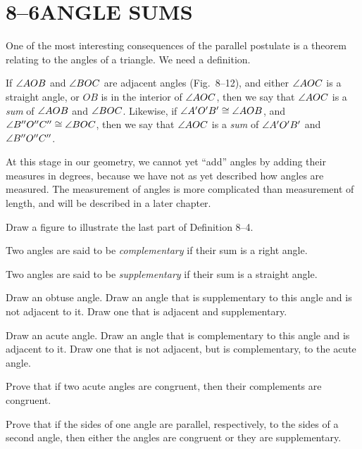 \documentclass[11pt]{book}
\begin{document}
\section*{8--6\quad ANGLE SUMS}

One of the most interesting consequences of the parallel postulate is a
theorem relating to the angles of a triangle. We need a definition.

\begin{definition}
If $\angle AOB$ and $\angle BOC$ are adjacent angles (Fig.~8--12), and either
$\angle AOC$ is a straight angle, or $OB$ is in the interior of $\angle AOC$,
then we say that $\angle AOC$ is a \emph{sum} of $\angle AOB$ and $\angle BOC$.
Likewise, if $\angle A'O'B' \cong \angle AOB$, and
$\angle B''O''C'' \cong \angle BOC$, then we say that $\angle AOC$ is a
\emph{sum} of $\angle A'O'B'$ and $\angle B''O''C''$.
\end{definition}

\FIGVIIITWELVE

\begin{remark}
At this stage in our geometry, we cannot yet ``add'' angles by adding their
measures in degrees, because we have not as yet described how angles are
measured. The measurement of angles is more complicated than measurement of
length, and will be described in a later chapter.
\end{remark}

Draw a figure to illustrate the last part of Definition 8--4.

\begin{definition}
Two angles are said to be \emph{complementary} if their sum is a right angle.
\end{definition}

\begin{definition}
Two angles are said to be \emph{supplementary} if their sum is a straight
angle.
\end{definition}

\begin{exercisecols}
\begin{exlist}
\item Draw an obtuse angle. Draw an angle that is supplementary to this angle
  and is not adjacent to it. Draw one that is adjacent and supplementary.
\item Draw an acute angle. Draw an angle that is complementary to this angle
  and is adjacent to it. Draw one that is not adjacent, but is complementary,
  to the acute angle.
\item Prove that if two acute angles are congruent, then their complements are
  congruent.
\item Prove that if the sides of one angle are parallel, respectively, to the
  sides of a second angle, then either the angles are congruent or they are
  supplementary.
\end{exlist}
\end{exercisecols}
\end{document}
